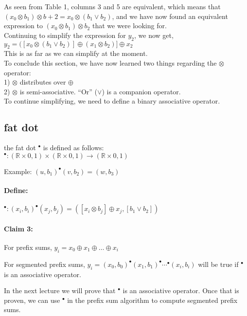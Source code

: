 \documentclass[11pt]{article}
\begin{document}
As seen from Table 1, columns 3 and 5 are equivalent, which means that $(x_0 \otimes b_1) \otimes b+2 = x_0 \otimes (b_1 \vee b_2)$, and we have now found an equivalent expression to $(x_0 \otimes b_1) \otimes b_2$ that we were looking for.\\

Continuing to simplify the expression for $y_2$, we now get,\\
$y_2 = ([x_0 \otimes (b_1 \vee b_2)] \oplus (x_1 \otimes b_2)] \oplus x_2$ \\
This is as far as we can simplify at the moment.\\

To conclude this section, we have now learned two things regarding the $\otimes$ operator:\\
1) $\otimes$ distributes over $\oplus$\\
2) $\otimes$ is semi-associative. “Or” ($\vee$) is a companion operator.\\

To continue simplifying, we need to define a binary associative operator.

\subsection{fat dot}

the fat dot $^{\bullet}$ is defined as follows:\\

$^{\bullet}: (\mathbb{R} \times {0,1}) \times (\mathbb{R} \times {0,1}) \longrightarrow (\mathbb{R} \times {0,1})$

Example: $(u, b_1) ^{\bullet} (v, b_2) = (w, b_3)$\\

\paragraph{Define:} $^{\bullet} : (x_i, b_i) ^{\bullet} (x_j, b_j) = ([x_i \otimes b_j] \oplus x_j , [b_1 \vee b_2])$

\paragraph{Claim 3:} For prefix sums, $y_i = x_0 \oplus x_1 \oplus \dots \oplus x_i$

For segmented prefix sums, $y_i = (x_0 , b_0) ^{\bullet} (x_1 , b_1) ^{\bullet} \cdots ^{\bullet} (x_i , b_i)$ will be true if $^{\bullet}$ is an associative operator.

In the next lecture we will prove that $^{\bullet}$ is an associative operator. Once that is proven, we can use $^{\bullet}$ in the prefix sum algorithm to compute segmented prefix sums.            

%

\end{document}
